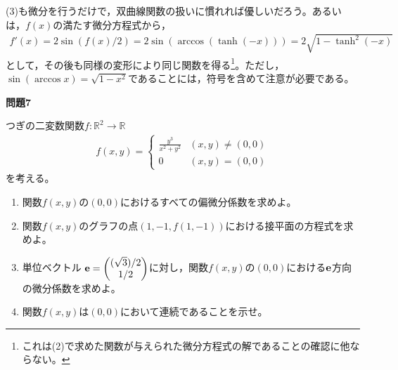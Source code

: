 \documentclass[a4paper,12pt,dvipdfmx,fleqn, oneside]{jsarticle}
\theoremstyle{defstyle}
\theoremstyle{thmx}
\theoremstyle{qesstyle}
\begin{document}
(3)も微分を行うだけで，双曲線関数の扱いに慣れれば優しいだろう。あるいは，$f(x)$の満たす微分方程式から，
\begin{align*}
    f'(x) = 2\sin (f(x)/2)= 2 \sin (\arccos (\tanh (-x))) = 2 \sqrt{1- \tanh^2(-x)}
\end{align*}
として，その後も同様の変形により同じ関数を得る\footnote{これは(2)で求めた関数が与えられた微分方程式の解であることの確認に他ならない。}。ただし，$\sin (\arccos x) = \sqrt{1-x^2}$であることには，符号を含めて注意が必要である。
\begin{shadebox}
    \textbf{問題7}

    \text{　}つぎの二変数関数$f: \mathbb{R}^2 \rightarrow \mathbb{R}$
    \begin{align*}
        f(x,y) =
        \begin{cases}
            \frac{y^3}{x^2+y^2} & (x,y) \neq (0,0) \\
            0                   & (x,y)= (0,0)
        \end{cases}
    \end{align*}
    を考える。
    \begin{enumerate}
        \item 関数$f(x,y)$の$(0,0)$におけるすべての偏微分係数を求めよ。
        \item 関数$f(x,y)$のグラフの点$(1,-1,f(1,-1))$における接平面の方程式を求めよ。
        \item 単位ベクトル $\bf{e}=
                  \begin{pmatrix}
                      (\sqrt{3})/2 \\
                      1/2
                  \end{pmatrix}$に対し，関数$f(x,y)$の$(0,0)$における$\bf{e}$方向の微分係数を求めよ。
        \item 関数$f(x,y)$は$(0,0)$において連続であることを示せ。
    \end{enumerate}
\end{shadebox}
\end{document}
